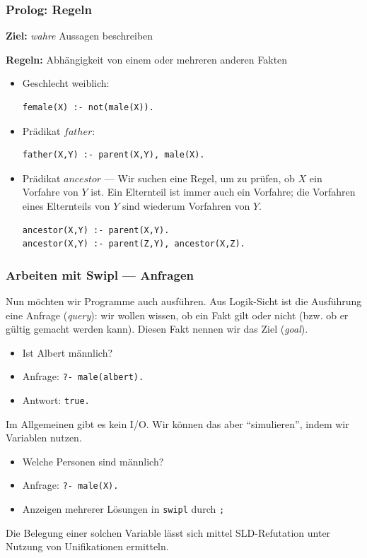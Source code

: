 \documentclass{beamer}
\begin{document}
\begin{frame}[fragile] \frametitle{Prolog: Regeln}
	\footnotesize
	
	\textbf{Ziel:} \textit{wahre} Aussagen beschreiben
	
	\textbf{Regeln:} Abhängigkeit von einem oder mehreren anderen Fakten
		
	\begin{itemize}
		\item Geschlecht weiblich: \pause
		\begin{lstlisting}[frame=l, basicstyle=\ttfamily\scriptsize,firstnumber=23]
female(X) :- not(male(X)).
		\end{lstlisting} \pause
		\item Prädikat $father$: \pause
		\begin{lstlisting}[frame=l, basicstyle=\ttfamily\scriptsize,firstnumber=25]
father(X,Y) :- parent(X,Y), male(X).
		\end{lstlisting} \pause
		\item Prädikat $ancestor$ --- Wir suchen eine Regel, um zu prüfen, ob $X$ ein Vorfahre von $Y$ ist.
		\pause
		Ein Elternteil ist immer auch ein Vorfahre; die Vorfahren eines Elternteils von $Y$ sind wiederum Vorfahren von $Y$.
		\pause
		\begin{lstlisting}[frame=l, basicstyle=\ttfamily\scriptsize,firstnumber=27]
ancestor(X,Y) :- parent(X,Y).
ancestor(X,Y) :- parent(Z,Y), ancestor(X,Z).
		\end{lstlisting}
	\end{itemize}
\end{frame}

\begin{frame} \frametitle{Arbeiten mit Swipl --- Anfragen}
	\footnotesize
	Nun möchten wir Programme auch ausführen. Aus Logik-Sicht ist die Ausführung eine Anfrage (\textit{query}): wir wollen wissen, ob ein Fakt gilt oder nicht (bzw. ob er gültig gemacht werden kann). Diesen Fakt nennen wir das Ziel (\textit{goal}).
	\begin{itemize}
		\item Ist Albert männlich?
		\item Anfrage: \texttt{?- male(albert).}
		\item Antwort: \texttt{true.}
	\end{itemize}

	\pause
	
	Im Allgemeinen gibt es kein I/O. Wir können das aber \enquote{simulieren}, indem wir Variablen nutzen. 
	\begin{itemize}
		\item Welche Personen sind männlich?
		\item Anfrage: \texttt{?- male(X).}
		\item Anzeigen mehrerer Lösungen in \texttt{swipl} durch \texttt{;}
	\end{itemize}

	Die Belegung einer solchen Variable lässt sich mittel SLD-Refutation unter Nutzung von Unifikationen ermitteln.
\end{frame}
\end{document}
